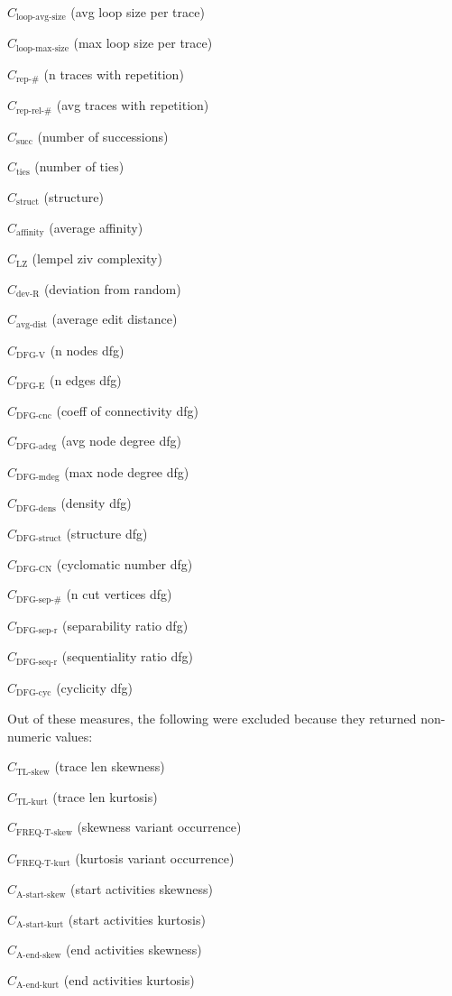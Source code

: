 \documentclass[a4paper]{article}
\newcommand{\startskewname}{\text{A-start-skew}}
\newcommand{\startskew}{C_{\startskewname}}
\newcommand{\startkurtname}{\text{A-start-kurt}}
\newcommand{\startkurt}{C_{\startkurtname}}
\newcommand{\lastskewname}{\text{A-end-skew}}
\newcommand{\lastskew}{C_{\lastskewname}}
\newcommand{\lastkurtname}{\text{A-end-kurt}}
\newcommand{\lastkurt}{C_{\lastkurtname}}
\newcommand{\tlskewnessname}{\text{TL-skew}}
\newcommand{\tlskewness}{C_{\tlskewnessname}}
\newcommand{\tlkurtosisname}{\text{TL-kurt}}
\newcommand{\tlkurtosis}{C_{\tlkurtosisname}}
\newcommand{\freqskewname}{\text{FREQ-T-skew}}
\newcommand{\freqskew}{C_{\freqskewname}}
\newcommand{\freqkurtname}{\text{FREQ-T-kurt}}
\newcommand{\freqkurt}{C_{\freqkurtname}}
\newcommand{\loopavgsizename}{\text{loop-avg-size}}
\newcommand{\loopavgsize}{C_{\loopavgsizename}}
\newcommand{\loopmaxsizename}{\text{loop-max-size}}
\newcommand{\loopmaxsize}{C_{\loopmaxsizename}}
\newcommand{\repnumname}{\text{rep-\#}}
\newcommand{\repnum}{C_{\repnumname}}
\newcommand{\reprelnumname}{\text{rep-rel-\#}}
\newcommand{\reprelnum}{C_{\reprelnumname}}
\newcommand{\dfgnodesname}{\text{DFG-V}}
\newcommand{\dfgnodes}{C_{\dfgnodesname}}
\newcommand{\dfgedgesname}{\text{DFG-E}}
\newcommand{\dfgedges}{C_{\dfgedgesname}}
\newcommand{\dfgcncname}{\text{DFG-cnc}}
\newcommand{\dfgcnc}{C_{\dfgcncname}}
\newcommand{\dfgavgdegname}{\text{DFG-adeg}}
\newcommand{\dfgavgdeg}{C_{\dfgavgdegname}}
\newcommand{\dfgmaxdegname}{\text{DFG-mdeg}}
\newcommand{\dfgmaxdeg}{C_{\dfgmaxdegname}}
\newcommand{\dfgdensname}{\text{DFG-dens}}
\newcommand{\dfgdens}{C_{\dfgdensname}}
\newcommand{\dfgstructname}{\text{DFG-struct}}
\newcommand{\dfgstruct}{C_{\dfgstructname}}
\newcommand{\dfgcycnumbername}{\text{DFG-CN}}
\newcommand{\dfgcycnumber}{C_{\dfgcycnumbername}}
\newcommand{\dfgsepnumname}{\text{DFG-sep-\#}}
\newcommand{\dfgsepnum}{C_{\dfgsepnumname}}
\newcommand{\dfgseprationame}{\text{DFG-sep-r}}
\newcommand{\dfgsepratio}{C_{\dfgseprationame}}
\newcommand{\dfgseqrationame}{\text{DFG-seq-r}}
\newcommand{\dfgseqratio}{C_{\dfgseqrationame}}
\newcommand{\dfgcycname}{\text{DFG-cyc}}
\newcommand{\dfgcyc}{C_{\dfgcycname}}
\newcommand{\numberofneighborhoodsname}{\text{succ}}
\newcommand{\numberofneighborhoods}{C_{\numberofneighborhoodsname}}
\newcommand{\numberoftiesname}{\text{ties}}
\newcommand{\numberofties}{C_{\numberoftiesname}}
\newcommand{\lempelzivname}{\text{LZ}}
\newcommand{\lempelziv}{C_{\lempelzivname}}
\newcommand{\structurename}{\text{struct}}
\newcommand{\structure}{C_{\structurename}}
\newcommand{\affinityname}{\text{affinity}}
\newcommand{\affinity}{C_{\affinityname}}
\newcommand{\deviationfromrandomname}{\text{dev-R}}
\newcommand{\deviationfromrandom}{C_{\deviationfromrandomname}}
\newcommand{\avgdistname}{\text{avg-dist}}
\newcommand{\avgdist}{C_{\avgdistname}}
\begin{document}
\begin{compactenum}
\item $\loopavgsize$ (avg loop size per trace)
\item $\loopmaxsize$ (max loop size per trace)
\item $\repnum$ (n traces with repetition)
\item $\reprelnum$ (avg traces with repetition)
\item $\numberofneighborhoods$ (number of successions)
\item $\numberofties$ (number of ties)
\item $\structure$ (structure)
\item $\affinity$ (average affinity)
\item $\lempelziv$ (lempel ziv complexity)
\item $\deviationfromrandom$ (deviation from random)
\item $\avgdist$ (average edit distance)
\item $\dfgnodes$ (n nodes dfg)
\item $\dfgedges$ (n edges dfg)
\item $\dfgcnc$ (coeff of connectivity dfg)
\item $\dfgavgdeg$ (avg node degree dfg)
\item $\dfgmaxdeg$ (max node degree dfg)
\item $\dfgdens$ (density dfg)
\item $\dfgstruct$ (structure dfg)
\item $\dfgcycnumber$ (cyclomatic number dfg)
\item $\dfgsepnum$ (n cut vertices dfg)
\item $\dfgsepratio$ (separability ratio dfg)
\item $\dfgseqratio$ (sequentiality ratio dfg)
\item $\dfgcyc$ (cyclicity dfg)
\end{compactenum}

\bigskip
\noindent
Out of these measures, the following were excluded because they returned non-numeric values:
\begin{compactenum}
\item $\tlskewness$ (trace len skewness)
\item $\tlkurtosis$ (trace len kurtosis)
\item $\freqskew$ (skewness variant occurrence)
\item $\freqkurt$ (kurtosis variant occurrence)
\item $\startskew$ (start activities skewness)
\item $\startkurt$ (start activities kurtosis)
\item $\lastskew$ (end activities skewness)
\item $\lastkurt$ (end activities kurtosis)
\end{compactenum}
\end{document}
